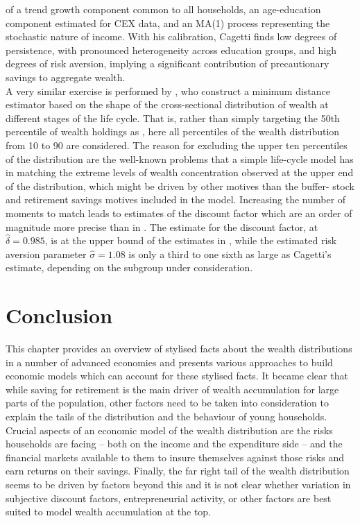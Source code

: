of a trend growth component common to all households, an age-education component
estimated for CEX data, and an MA(1) process representing the stochastic nature
of income. With his calibration, Cagetti finds low degrees of persistence, with
pronounced heterogeneity across education groups, and high degrees of risk 
aversion, implying a significant contribution of precautionary savings to 
aggregate wealth. \\
A very similar exercise is performed by \citet{HintermaierKoeniger2011}, who 
construct a minimum distance estimator based on the shape of the cross-sectional
distribution of wealth at different stages of the life cycle. That is, rather
than simply targeting the 50th percentile of wealth holdings  as 
\citet{Cagetti2003}, here all percentiles of the wealth distribution from 10 
to 90 are considered. The reason for excluding the upper ten percentiles of the
distribution are the well-known problems that a simple life-cycle model has in 
matching the extreme levels of wealth concentration observed at the upper end 
of the distribution, which might be driven by other motives than the buffer-
stock and retirement savings motives included in the model. Increasing the 
number of moments to match leads to estimates of the discount factor which are 
an order of magnitude more precise than in \citet{Cagetti2003}. The estimate for
the discount factor, at $\hat{\delta}=0.985$, is at the upper bound of the
estimates in \citet{Cagetti2003}, while the estimated risk aversion parameter
$\hat{\sigma}=1.08$ is only a third to one sixth as large as Cagetti's estimate,
depending on the subgroup under consideration.  


\citet{CastanedaRiosRull2003}
\citet{DPMRR2003}
\citet{Floden2008}
\citet{BenhabibBisinZhu2011}
\citet{DeNardiYang2015}

\section{Conclusion}
This chapter provides an overview of stylised facts about the wealth 
distributions in a number of advanced economies and presents various approaches 
to build economic models which can account for these stylised facts.
It became clear that while saving for retirement is the main driver of wealth
accumulation for large parts of the population, other factors need to be taken
into consideration to explain the tails of the distribution and the behaviour of
young households. Crucial aspects of an economic model of the wealth 
distribution are the risks households are facing -- both on the income and the 
expenditure side -- and the financial markets available to them to insure 
themselves against those risks and earn returns on their savings. Finally, the 
far right tail of the wealth distribution seems to be driven by factors beyond 
this and it is not clear whether variation in subjective discount factors, 
entrepreneurial activity, or other factors are best suited to model wealth 
accumulation at the top.
 